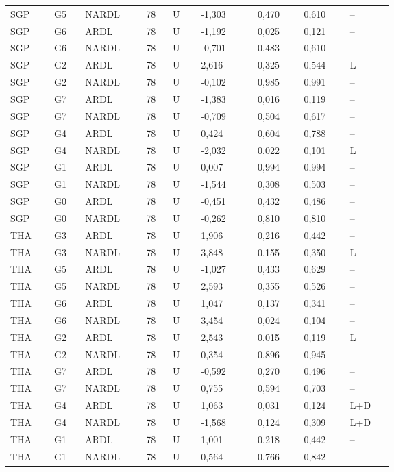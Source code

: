 {\begin{longtable}{p{0.075\linewidth}p{0.05\linewidth}p{0.09\linewidth}p{0.04\linewidth}p{0.05\linewidth}p{0.1\linewidth}p{0.085\linewidth}p{0.085\linewidth}p{0.075\linewidth}}
SGP & G5 & NARDL & 78 & U & -1,303 & 0,470 & 0,610 & --\\
SGP & G6 & ARDL & 78 & U & -1,192 & 0,025 & 0,121 & --\\
SGP & G6 & NARDL & 78 & U & -0,701 & 0,483 & 0,610 & --\\
SGP & G2 & ARDL & 78 & U & 2,616 & 0,325 & 0,544 & L\\
SGP & G2 & NARDL & 78 & U & -0,102 & 0,985 & 0,991 & --\\
SGP & G7 & ARDL & 78 & U & -1,383 & 0,016 & 0,119 & --\\
SGP & G7 & NARDL & 78 & U & -0,709 & 0,504 & 0,617 & --\\
SGP & G4 & ARDL & 78 & U & 0,424 & 0,604 & 0,788 & --\\
SGP & G4 & NARDL & 78 & U & -2,032 & 0,022 & 0,101 & L\\
SGP & G1 & ARDL & 78 & U & 0,007 & 0,994 & 0,994 & --\\
SGP & G1 & NARDL & 78 & U & -1,544 & 0,308 & 0,503 & --\\
SGP & G0 & ARDL & 78 & U & -0,451 & 0,432 & 0,486 & --\\
SGP & G0 & NARDL & 78 & U & -0,262 & 0,810 & 0,810 & --\\
THA & G3 & ARDL & 78 & U & 1,906 & 0,216 & 0,442 & --\\
THA & G3 & NARDL & 78 & U & 3,848 & 0,155 & 0,350 & L\\
THA & G5 & ARDL & 78 & U & -1,027 & 0,433 & 0,629 & --\\
THA & G5 & NARDL & 78 & U & 2,593 & 0,355 & 0,526 & --\\
THA & G6 & ARDL & 78 & U & 1,047 & 0,137 & 0,341 & --\\
THA & G6 & NARDL & 78 & U & 3,454 & 0,024 & 0,104 & --\\
THA & G2 & ARDL & 78 & U & 2,543 & 0,015 & 0,119 & L\\
THA & G2 & NARDL & 78 & U & 0,354 & 0,896 & 0,945 & --\\
THA & G7 & ARDL & 78 & U & -0,592 & 0,270 & 0,496 & --\\
THA & G7 & NARDL & 78 & U & 0,755 & 0,594 & 0,703 & --\\
THA & G4 & ARDL & 78 & U & 1,063 & 0,031 & 0,124 & L+D\\
THA & G4 & NARDL & 78 & U & -1,568 & 0,124 & 0,309 & L+D\\
THA & G1 & ARDL & 78 & U & 1,001 & 0,218 & 0,442 & --\\
THA & G1 & NARDL & 78 & U & 0,564 & 0,766 & 0,842 & --\\

\end{longtable}}
